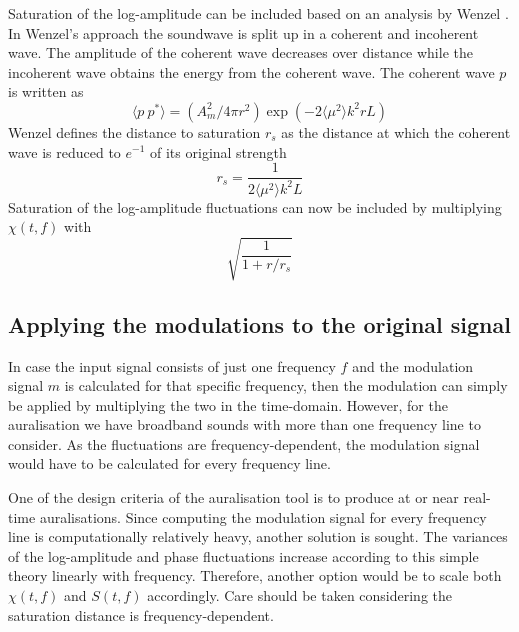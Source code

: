 Saturation of the log-amplitude can be included based on an analysis by Wenzel \cite{Wenzel1975}.
In Wenzel's approach the soundwave is split up in a coherent and incoherent wave. The amplitude of the coherent wave decreases over distance while the incoherent wave obtains the energy from the coherent wave.
The coherent wave $p$ is written as
\begin{equation}
 \langle p \  p^* \rangle = \left( A_m^2 / 4 \pi r^2 \right) \exp{\left( -2 \langle \mu^2 \rangle k^2 r L \right)}
\end{equation}
Wenzel defines the distance to saturation $r_s$ as the distance at which the coherent wave is reduced to $e^{-1}$ of its original strength
\begin{equation}\label{eq:saturation_distance}
 r_s = \frac{1}{2 \langle \mu^2 \rangle k^2 L}
\end{equation}
Saturation of the log-amplitude fluctuations can now be included by multiplying $\chi(t,f)$ with
\begin{equation}
 \sqrt{ \frac{ 1}{1 + r/r_s}}
\end{equation}


\subsection{Applying the modulations to the original signal}
In case the input signal consists of just one frequency $f$ and the modulation 
signal $m$ is calculated for that specific frequency, then the modulation can simply be 
applied by multiplying the two in the time-domain.
However, for the auralisation we have broadband sounds with more than one frequency line to consider. 
As the fluctuations are frequency-dependent, the modulation 
signal would have to be calculated for every frequency line.

One of the design criteria of the auralisation tool is to produce at or near 
real-time auralisations. Since computing the modulation signal for every 
frequency line is computationally relatively heavy, another solution is sought.
The variances of the log-amplitude and phase fluctuations increase according to 
this simple theory linearly with frequency. Therefore, another option would be to scale both 
$\chi(t,f)$ and $S(t,f)$ accordingly. Care should be taken considering the saturation distance is frequency-dependent.
